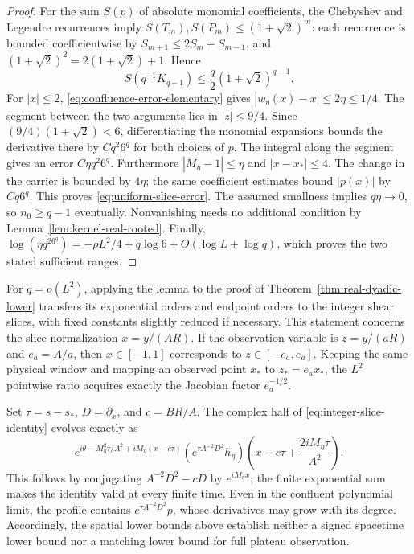 \begin{proof}
For the sum $S(p)$ of absolute monomial coefficients, the Chebyshev and
Legendre recurrences imply
$S(T_m),S(P_m)\le(1+\sqrt2)^m$: each recurrence is bounded
coefficientwise by $S_{m+1}\le2S_m+S_{m-1}$, and
$(1+\sqrt2)^2=2(1+\sqrt2)+1$. Hence
\[
 S(q^{-1}K_{q-1})\le\frac q2(1+\sqrt2)^{q-1}.
\]
For $|x|\le2$, \eqref{eq:confluence-error-elementary} gives
$|w_\eta(x)-x|\le2\eta\le1/4$. The segment between the two arguments
lies in $|z|\le9/4$. Since $(9/4)(1+\sqrt2)<6$, differentiating the
monomial expansions bounds the derivative there by $Cq^2 6^q$ for
both choices of $p$. The integral along the segment gives an error
$C\eta q^2 6^q$.
Furthermore $|M_\eta-1|\le\eta$ and $|x-x_*|\le4$. The change in
the carrier is bounded by $4\eta$; the same coefficient estimates bound
$|p(x)|$ by $Cq6^q$. This proves \eqref{eq:uniform-slice-error}.
The assumed smallness implies $q\eta\to0$, so $n_0\ge q-1$ eventually.
Nonvanishing needs no additional condition by
Lemma~\ref{lem:kernel-real-rooted}.
Finally,
$\log(\eta q^26^q)=-\rho L^2/4+q\log6+O(\log L+\log q)$,
which proves the two stated sufficient ranges.
\end{proof}

For $q=o(L^2)$, applying the lemma to the proof of
Theorem~\ref{thm:real-dyadic-lower} transfers its exponential orders and
endpoint orders to the integer shear slices, with fixed constants
slightly reduced if necessary. This statement concerns the slice
normalization $x=y/(AR)$. If the observation variable is $z=y/(aR)$
and $e_a=A/a$, then $x\in[-1,1]$ corresponds to
$z\in[-e_a,e_a]$. Keeping the same physical window and mapping
an observed point $x_*$ to $z_*=e_ax_*$, the $L^2$ pointwise ratio
acquires exactly the Jacobian factor $e_a^{-1/2}$.

\begin{remark}
Set $\tau=s-s_*$, $D=\partial_x$, and $c=BR/A$. The complex half of
\eqref{eq:integer-slice-identity} evolves exactly as
\[
 e^{i\theta-M_\eta^2\tau/A^2+iM_\eta(x-c\tau)}
 \left(e^{\tau A^{-2}D^2}h_\eta\right)
 \left(x-c\tau+\frac{2iM_\eta\tau}{A^2}\right).
\]
This follows by conjugating $A^{-2}D^2-cD$ by $e^{iM_\eta x}$;
the finite exponential sum makes the identity valid at every finite
time. Even in the confluent polynomial limit, the profile contains
$e^{\tau A^{-2}D^2}p$, whose derivatives may grow with its degree.
Accordingly, the spatial lower bounds above establish neither a
signed spacetime lower bound nor a matching lower bound for full
plateau observation.
\end{remark}
